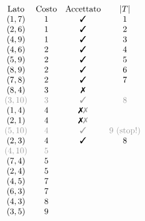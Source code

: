\begin{equation*}
\begin{array}{ c c c c }
\text{Lato} & \text{Costo} & \text{Accettato} & | T| \\
( 1,7) & 1 & \text{\cmark}  & 1\\
( 2,6) & 1 & \text{\cmark}  & 2\\
( 4,9) & 1 & \text{\cmark}  & 3\\
( 4,6) & 2 & \text{\cmark}  & 4\\
( 5,9) & 2 & \text{\cmark}  & 5\\
( 8,9) & 2 & \text{\cmark}  & 6\\
( 7,8) & 2 & \text{\cmark}  & 7\\
( 8,4) & 3 & \text{\xmark}  & \\
\textcolor[rgb]{0.61,0.61,0.61}{( 3,10)} & \textcolor[rgb]{0.61,0.61,0.61}{3} & \text{\textcolor[rgb]{0.61,0.61,0.61}{\cmark }} & \textcolor[rgb]{0.61,0.61,0.61}{8}\\
( 1,4) & 4 & \text{\xmark \textcolor[rgb]{0.61,0.61,0.61}{\xmark }} & \\
( 2,1) & 4 & \text{\xmark \textcolor[rgb]{0.61,0.61,0.61}{\xmark }} & \\
\textcolor[rgb]{0.61,0.61,0.61}{( 5,10}\textcolor[rgb]{0.61,0.61,0.61}{)} & \textcolor[rgb]{0.61,0.61,0.61}{4} & \text{\textcolor[rgb]{0.61,0.61,0.61}{\cmark }} & \textcolor[rgb]{0.61,0.61,0.61}{9\ \text{(stop!)}}\\
( 2,3) & 4 & \text{\cmark}  & 8\\
\textcolor[rgb]{0.61,0.61,0.61}{( 4,10}\textcolor[rgb]{0.61,0.61,0.61}{)} & \textcolor[rgb]{0.61,0.61,0.61}{5} &  & \\
( 7,4) & 5 &  & \\
( 2,4) & 5 &  & \\
( 4,5) & 7 &  & \\
( 6,3) & 7 &  & \\
( 4,3) & 8 &  & \\
( 3,5) & 9 &  & 
\end{array}
\end{equation*}